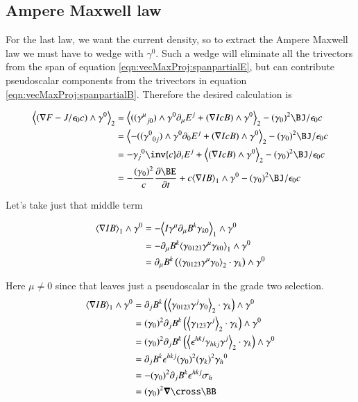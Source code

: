 \subsection{Ampere Maxwell law }

For the last law, we want the current density, so to extract the Ampere Maxwell law we must have to wedge with $\gamma^0$.  Such a wedge will eliminate all the trivectors from the span of equation \ref{eqn:vecMaxProj:spanpartialE}, but can contribute pseudoscalar components from the trivectors in equation \ref{eqn:vecMaxProj:spanpartialB}.  Therefore the desired calculation is

\begin{align*}
\gpgradetwo{\left(\grad F - J/\epsilon_0 c\right) \wedge \gamma^0}
&= \gpgradetwo{ (({\gamma^{\mu}}_{j0}) \wedge \gamma^0 \partial_{\mu} E^j + (\grad I c B) \wedge \gamma^0 } - (\gamma_0)^2 \BJ/\epsilon_0 c \\
&= \gpgradetwo{ -(({\gamma^{0}}_{0j}) \wedge \gamma^0 \partial_{0} E^j + (\grad I c B) \wedge \gamma^0 } - (\gamma_0)^2 \BJ/\epsilon_0 c \\
&= -{\gamma_{j}}^0 \inv{c} \partial_t E^j + \gpgradetwo{ (\grad I c B) \wedge \gamma^0 } - (\gamma_0)^2 \BJ/\epsilon_0 c \\
&= - \frac{(\gamma_0)^2}{c} \PD{t}{\BE} + c \gpgradeone{ \grad I B} \wedge \gamma^0 - (\gamma_0)^2 \BJ/\epsilon_0 c \\
\end{align*}

Let's take just that middle term

\begin{align*}
{\left\langle{{ \nabla I B }}\right\rangle}_{1} \wedge \gamma^0
&= -{\left\langle{{ I \gamma^{\mu} \partial_{\mu} B^k \gamma_{k0} }}\right\rangle}_{1} \wedge \gamma^0 \\
&= - \partial_{\mu} B^k {\left\langle{{ \gamma_{0123} \gamma^{\mu} \gamma_{k0} }}\right\rangle}_{1} \wedge \gamma^0 \\
&= \partial_{\mu} B^k \left({\left\langle{{ \gamma_{0123} \gamma^{\mu} \gamma_{0} }}\right\rangle}_{2} \cdot \gamma_k\right) \wedge \gamma^0
\end{align*}

Here $\mu \ne 0$ since that leaves just a pseudoscalar in the grade two selection.
\begin{align*}
\gpgradeone{ \grad I B } \wedge \gamma^0
&= \partial_{j} B^k \left(\gpgradetwo{ \gamma_{0123} \gamma^{j} \gamma_{0} } \cdot \gamma_k\right) \wedge \gamma^0 \\
&= (\gamma_0)^2 \partial_{j} B^k \left(\gpgradetwo{ \gamma_{123} \gamma^{j} } \cdot \gamma_k\right) \wedge \gamma^0 \\
&= (\gamma_0)^2 \partial_{j} B^k \left(\gpgradetwo{ \epsilon^{hkj}\gamma_{hkj} \gamma^{j} } \cdot \gamma_k\right) \wedge \gamma^0 \\
&= \partial_{j} B^k \epsilon^{hkj} (\gamma_0)^2 (\gamma_k)^2 {\gamma_{h}}^0 \\
&= - (\gamma_0)^2 \partial_{j} B^k \epsilon^{hkj} \sigma_h \\
&= (\gamma_0)^2 \spacegrad \cross \BB
\end{align*}

